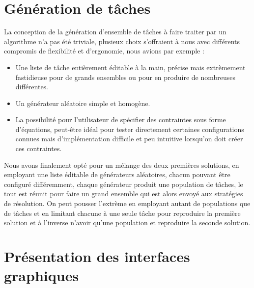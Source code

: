 \section{Génération de tâches}
La conception de la génération d'ensemble de tâches à faire traiter par un
algorithme n'a pas été triviale, plusieux choix s'offraient à nous avec différents
compromis de flexibilité et d'ergonomie, nous avions par exemple :
\begin{itemize}
   \item Une liste de tâche entièrement éditable à la main, précise mais extrèmement
   fastidieuse pour de grands ensembles ou pour en produire de nombreuses différentes.
   \item Un générateur aléatoire simple et homogène.
   \item La possibilité pour l'utilisateur de spécifier des contraintes sous forme
   d'équations, peut-être idéal pour tester directement certaines configurations
   connues mais d'implémentation difficile et peu intuitive lorsqu'on doit créer
   ces contraintes.
\end{itemize}
Nous avons finalement opté pour un mélange des deux premières solutions, en
employant une liste éditable de générateurs aléatoires, chacun pouvant être
configuré différemment, chaque générateur produit une population de tâches,
le tout est réunit pour faire un grand ensemble qui est alors envoyé aux
stratégies de résolution. On peut pousser l'extrème en employant autant de
populations que de tâches et en limitant chacune à une seule tâche pour reproduire
la première solution et à l'inverse n'avoir qu'une population et reproduire la seconde
solution.
\section{Présentation des interfaces graphiques}
